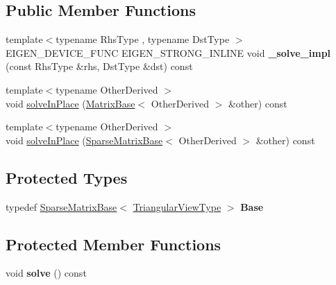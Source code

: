 \subsection*{Public Member Functions}
\begin{DoxyCompactItemize}
\item 
\mbox{\label{class_eigen_1_1_triangular_view_impl_3_01_matrix_type_00_01_mode_00_01_sparse_01_4_a6a290dc48e4276fcbf574c6af28af5cc}} 
{\footnotesize template$<$typename Rhs\+Type , typename Dst\+Type $>$ }\\E\+I\+G\+E\+N\+\_\+\+D\+E\+V\+I\+C\+E\+\_\+\+F\+U\+NC E\+I\+G\+E\+N\+\_\+\+S\+T\+R\+O\+N\+G\+\_\+\+I\+N\+L\+I\+NE void {\bfseries \+\_\+solve\+\_\+impl} (const Rhs\+Type \&rhs, Dst\+Type \&dst) const
\item 
{\footnotesize template$<$typename Other\+Derived $>$ }\\void \mbox{\hyperlink{class_eigen_1_1_triangular_view_impl_3_01_matrix_type_00_01_mode_00_01_sparse_01_4_a3f3385e827fcc0bf27d1ec21c80740bc}{solve\+In\+Place}} (\mbox{\hyperlink{class_eigen_1_1_matrix_base}{Matrix\+Base}}$<$ Other\+Derived $>$ \&other) const
\item 
{\footnotesize template$<$typename Other\+Derived $>$ }\\void \mbox{\hyperlink{class_eigen_1_1_triangular_view_impl_3_01_matrix_type_00_01_mode_00_01_sparse_01_4_a70190d4105e1fd4f27abbf73365dfa0c}{solve\+In\+Place}} (\mbox{\hyperlink{class_eigen_1_1_sparse_matrix_base}{Sparse\+Matrix\+Base}}$<$ Other\+Derived $>$ \&other) const
\end{DoxyCompactItemize}
\subsection*{Protected Types}
\begin{DoxyCompactItemize}
\item 
\mbox{\label{class_eigen_1_1_triangular_view_impl_3_01_matrix_type_00_01_mode_00_01_sparse_01_4_a3b021ddc08edc7915d178d27d269a272}} 
typedef \mbox{\hyperlink{class_eigen_1_1_sparse_matrix_base}{Sparse\+Matrix\+Base}}$<$ \mbox{\hyperlink{class_eigen_1_1_triangular_view}{Triangular\+View\+Type}} $>$ {\bfseries Base}
\end{DoxyCompactItemize}
\subsection*{Protected Member Functions}
\begin{DoxyCompactItemize}
\item 
\mbox{\label{class_eigen_1_1_triangular_view_impl_3_01_matrix_type_00_01_mode_00_01_sparse_01_4_a47379381e1682f59b85212cf856bab2a}} 
void {\bfseries solve} () const
\end{DoxyCompactItemize}
